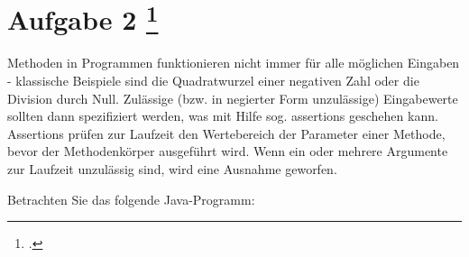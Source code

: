 \documentclass{lehramt-informatik-aufgabe}
\begin{document}
\section{Aufgabe 2
\footcite{examen:66116:2019:09}}

Methoden in Programmen funktionieren nicht immer für alle möglichen
Eingaben - klassische Beispiele sind die Quadratwurzel einer negativen
Zahl oder die Division durch Null. Zulässige (bzw. in negierter Form
unzulässige) Eingabewerte sollten dann spezifiziert werden, was mit
Hilfe sog. assertions geschehen kann. Assertions prüfen zur Laufzeit den
Wertebereich der Parameter einer Methode, bevor der Methodenkörper
ausgeführt wird. Wenn ein oder mehrere Argumente zur Laufzeit unzulässig
sind, wird eine Ausnahme geworfen.

\bigskip

\noindent
Betrachten Sie das folgende Java-Programm:

\end{document}
